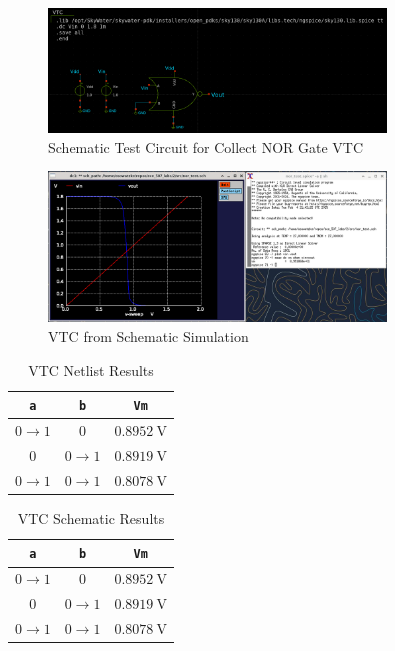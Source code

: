 \documentclass{article}
\begin{document}
	\begin{figure}[H]
		\centerline{\includegraphics[width=0.8\textwidth]{nor_vtc_test_circuit.png}}
		\caption{Schematic Test Circuit for Collect NOR Gate VTC}
		\label{fig::nor_vtc_schem_test_circuit}
	\end{figure}
	
	\begin{figure}[H]
		\centerline{\includegraphics[width=0.8\textwidth]{nor_vtc_schem.png}}
		\caption{VTC from Schematic Simulation}
		\label{fig::nor_vtc_schem}
	\end{figure}
	
	\begin{table}[H]
	\begin{center}
	\caption{VTC Netlist Results}
	\label{table::nor_vtc_netlist}
	\begin{tabular}{| c | c | c |}
		\hline
		\texttt{a} & \texttt{b} & \texttt{Vm}\\
		\hline	
		$0 \rightarrow 1$ & $0$ & $0.8952\ \text{V}$\\
		\hline	
		$0$ & $0 \rightarrow 1$ & $0.8919\ \text{V}$\\
		\hline	
		$0 \rightarrow 1$ & $0 \rightarrow 1$ & $0.8078\ \text{V}$\\
		\hline
	\end{tabular}
	\end{center}
	\end{table}
	
	\begin{table}[H]
	\begin{center}
	\caption{VTC Schematic Results}
	\label{table::nor_vtc_schematic}
	\begin{tabular}{| c | c | c |}
		\hline
		\texttt{a} & \texttt{b} & \texttt{Vm}\\
		\hline	
		$0 \rightarrow 1$ & $0$ & $0.8952\ \text{V}$\\
		\hline	
		$0$ & $0 \rightarrow 1$ & $0.8919\ \text{V}$\\
		\hline	
		$0 \rightarrow 1$ & $0 \rightarrow 1$ & $0.8078\ \text{V}$\\
		\hline
	\end{tabular}
	\end{center}
	\end{table}
	
\end{document}
